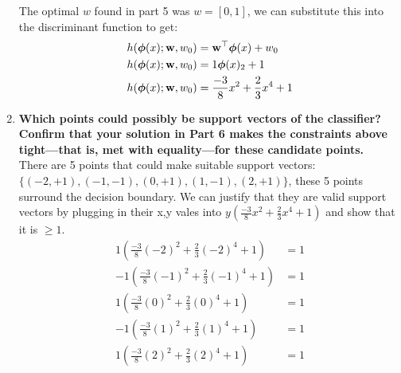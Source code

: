 \documentclass[submit]{harvardml}
\begin{document}
\begin{enumerate}
    The optimal $w$ found in part 5 was $ w = [0,1]$, we can substitute this into the discriminant function to get:\\
    
    \begin{align*}
        h(\boldsymbol{\phi}(x);\mathbf{w},w_0) &= \mathbf{w}^\top\boldsymbol{\phi}(x) +w_0\\
        h(\boldsymbol{\phi}(x);\mathbf{w},w_0) &= 1\boldsymbol{\phi}(x)_2 + 1 \\
        h(\boldsymbol{\phi}(x);\mathbf{w},w_0) &= \frac{-3}{8}x^2 + \frac{2}{3} x^4 + 1 \\
    \end{align*}
    
    \item \textbf{Which points could possibly be support vectors of the classifier?  Confirm that your solution in Part 6 makes the constraints above tight—that is, met with equality—for these candidate points.}\\
     
    There are 5 points that could make suitable support vectors: $\{ (-2 , +1 ) , (-1,  -1 ), (0, +1), ( 1 , -1 ), ( 2 , +1 )\}$, these 5 points surround the decision boundary. We can justify that they are valid support vectors by plugging in their x,y vales into $y(\frac{-3}{8}x^2 + \frac{2}{3} x^4 + 1)$ and show that it is $\geq 1$.
    \begin{align*}
        1(\frac{-3}{8}(-2)^2 + \frac{2}{3} (-2)^4 + 1) &= 1 \\
        -1(\frac{-3}{8}(-1)^2 + \frac{2}{3} (-1)^4 + 1) &= 1 \\
        1(\frac{-3}{8}(0)^2 + \frac{2}{3} (0)^4 + 1) &= 1 \\
        -1(\frac{-3}{8}(1)^2 + \frac{2}{3} (1)^4 + 1) &= 1 \\
        1(\frac{-3}{8}(2)^2 + \frac{2}{3} (2)^4 + 1) &= 1 \\
    \end{align*}
\end{enumerate}

\end{document}
